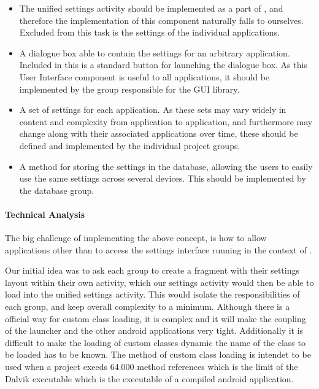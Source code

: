 \begin{itemize}
	\item The unified settings activity should be implemented as a part of \launcher, and therefore the implementation of this component naturally falls to ourselves. 
	Excluded from this task is the settings of the individual applications.
	\item A dialogue box able to contain the settings for an arbitrary \giraf application. Included in this is a standard button for launching the dialogue box. 
	As this User Interface component is useful to all applications, it should be implemented by the group responsible for the \giraf GUI library.
	\item A set of settings for each \giraf application.
	As these sets may vary widely in content and complexity from application to application, and furthermore may change along with their associated applications over time, these should be defined and implemented by the individual project groups. 
	\item A method for storing the settings in the database, allowing the users to easily use the same settings across several devices. 
	This should be implemented by the database group. 
\end{itemize}


\paragraph{Technical Analysis} 
The big challenge of implementing the above concept, is how to allow applications other than \launcher to access the settings interface running in the context of \launcher.

Our initial idea was to ask each group to create a fragment with their settings layout within their own activity, which our settings activity would then be able to load into the unified settings activity.
This would isolate the responsibilities of each group, and keep overall complexity to a minimum.
Although there is a official way for custom class loading\cite{customClassLoading}, it is complex and it will make the coupling of the launcher and the other android applications very tight.
Additionally it is difficult to make the loading of custom classes dynamic the name of the class to be loaded has to be known.
The method of custom class loading is intendet to be used when a project exeeds 64.000 method references which is the limit of the Dalvik executable which is the executable of a compiled android application.

